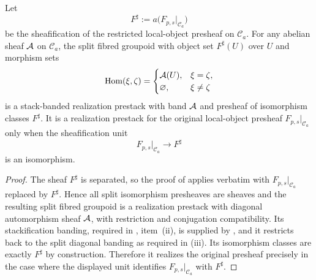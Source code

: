 \begin{corollary}\label{cor:sheafified-split-lift}
Let
\[
F^\sharp:=a\bigl(F_{p,s}|_{\mathcal C_a}\bigr)
\]
be the sheafification of the restricted local-object presheaf on $\mathcal C_a$. For any abelian sheaf $\mathcal{A}$ on $\mathcal C_a$, the split fibred groupoid with object set $F^\sharp(U)$ over $U$ and morphism sets
\[
\mathrm{Hom}(\xi,\zeta)=
\begin{cases}
\mathcal{A}(U), & \xi=\zeta,\\
\varnothing, & \xi\neq \zeta
\end{cases}
\]
is a stack-banded realization prestack with band $\mathcal{A}$ and presheaf of
isomorphism classes $F^\sharp$. It is a realization prestack for the original
local-object presheaf $F_{p,s}|_{\mathcal C_a}$ only when the sheafification unit
\[
F_{p,s}|_{\mathcal C_a}\longrightarrow F^\sharp
\]
is an isomorphism.
\end{corollary}

\begin{proof}
The sheaf $F^\sharp$ is separated, so the proof of  applies verbatim with $F_{p,s}|_{\mathcal C_a}$ replaced by $F^\sharp$. Hence all split isomorphism presheaves are sheaves and the resulting split fibred groupoid is a realization prestack with diagonal automorphism sheaf $\mathcal{A}$, with restriction and conjugation compatibility. Its stackification banding, required in , item~\textup{(ii)}, is supplied by , and it restricts back to the split diagonal banding as required in \textup{(iii)}. Its isomorphism classes are exactly $F^\sharp$ by construction. Therefore it realizes the original presheaf precisely in the case where the displayed unit identifies $F_{p,s}|_{\mathcal C_a}$ with $F^\sharp$.
\end{proof}

